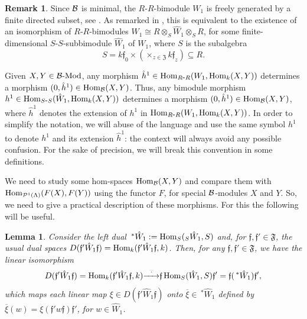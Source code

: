 \documentclass{article}
\newtheorem{lemma}[theorem]{Lemma}
\theoremstyle{definition}
\newtheorem{remark}[theorem]{Remark}
\newcommand{\Hom}{{ \rm Hom }}
\newcommand{\Mod}{{ \rm Mod }}
\renewcommand{\frak}{\mathfrak}
\newcommand{\g}{\hbox{-}}
\newcommand{\rightmap}[1]{\smash{\mathop{\hbox to 
20pt{\rightarrowfill}}\limits^{#1}}}
\begin{document}
\begin{remark}\label{R: morfismos en B-Mod}
Since ${\cal B}$ is minimal,  the $R$-$R$-bimodule  $W_1$ is  freely generated by a finite directed subset, see \cite[(23.2)]{BSZ}. As remarked in  \cite[(15.7)]{BSZ}, this is equivalent to the existence of an isomorphism of $R$-$R$-bimodules $W_1\cong R\otimes_S\hat{W}_1\otimes_SR$, for some finite-dimensional $S$-$S$-subbimodule $\hat{W}_1$ of $W_1$, where $S$ is the subalgebra  
 $$S=k\frak{f}_0\times \left(\times_{z\in \frak{Z}}k\frak{f}_z\right) \subseteq R.$$    


Given $X,Y\in {\cal B}\g\Mod$, any morphism $\hat{h}^1\in \Hom_{R\g R}(W_1,\Hom_k(X,Y))$ determines a morphism $(0,\hat{h}^1)\in \Hom_{\cal B}(X,Y)$. Thus, any bimodule morphism  
$h^1\in \Hom_{S\g S}(\hat{W}_1,\Hom_k(X,Y))$ determines a morphism $(0,\hat{h}^1)\in \Hom_{\cal B}(X,Y)$,  where $\hat{h}^1$ denotes the extension of $h^1$ in $\Hom_{R\g R}(W_1,\Hom_k(X,Y))$. In order to simplify the notation, we will abuse of the language and use the same symbol $h^1$ to denote $h^1$ and its extension   $\hat{h}^1$: the context will always avoid any possible confusion. For the sake of precision, we will break this convention
in some definitions. 
\end{remark}



 We need to study some hom-spaces $\Hom_{\cal B}(X,Y)$ and compare them with $\Hom_{{\cal P}^1(\Lambda)}(F(X),F(Y))$ using the functor $F$, for special ${\cal B}$-modules $X$ and $Y$. So, we need to give a practical description of these morphisms. For this the following will be useful. 

\begin{lemma}\label{L: isos entre duales}
Consider the left dual  
$\,^*\hat{W}_1:=\Hom_S(_S\hat{W}_1,S)$ and, for $\frak{f},\frak{f}'\in \frak{F}$, the usual dual spaces $D(\frak{f}'\hat{W}_1\frak{f})=\Hom_k(\frak{f}'\hat{W}_1\frak{f},k)$. Then, 
for any $\frak{f},\frak{f}'\in \frak{F}$, we have the linear  isomorphism  
$$
D(\frak{f}'\hat{W}_1 \frak{f})=\Hom_k(\frak{f}'\hat{W}_1 \frak{f},k)\rightmap{\overline{\,\cdot\,}}\frak{f}\,\Hom_S(\hat{W}_1,S)\frak{f}'=
\frak{f}(\,^*\hat{W}_1)\frak{f}',$$
which maps each linear map $\xi\in D(\frak{f}'\hat{W}_1 \frak{f})$ onto  $\overline{\xi}\in \,^*\hat{W}_1$ defined by $\overline{\xi}(w)=\xi(\frak{f}'w\frak{f})\frak{f}'$, for $w\in \hat{W}_1$.  
\end{lemma}
\end{document}
